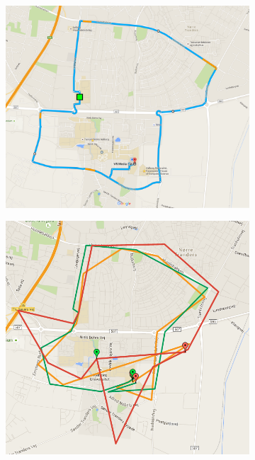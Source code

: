 \begin{figure}[h]
	\begin{subfigure}[b]{0.55\textwidth}
		\includegraphics[width=\textwidth, trim={0 0 1cm 0},clip]{figures/testroute.png}
		\caption{}
		\label{fig:testroute}
	\end{subfigure}
	\begin{subfigure}[b]{0.44\textwidth}
		\includegraphics[width=\textwidth, trim={0 0 2cm 1.2cm},clip]{figures/testRouteRecordings.png}
		\caption{}
		\label{fig:testrouterecordings}
	\end{subfigure}
	\caption{}
\end{figure}

